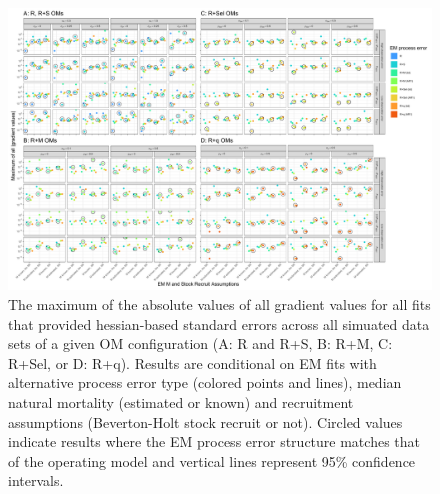 \documentclass[
  12pt,
]{article}
\begin{document}
\begin{landscape}
\begin{figure}
\begin{center}
\includegraphics{hess_grad_convergence_plots}
\end{center}
\caption{The maximum of the absolute values of all gradient values for all fits that provided hessian-based standard errors across all simuated data sets of a given OM configuration (A: R and R+S, B: R+M, C: R+Sel, or D: R+q).  Results are conditional on EM fits with alternative process error type (colored points and lines), median natural mortality (estimated or known) and recruitment assumptions (Beverton-Holt stock recruit or not). Circled values indicate results where the EM process error structure matches that of the operating model and vertical lines represent 95\% confidence intervals.}\label{hess_grad}
\end{figure}
\end{landscape}
\end{document}
